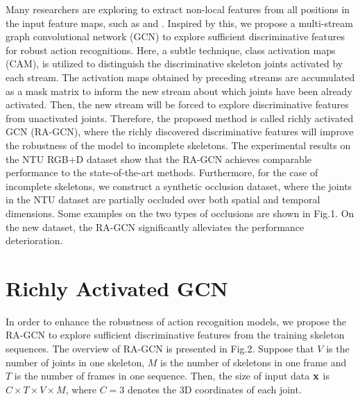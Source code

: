 \documentclass{article}
\begin{document}
Many researchers are exploring to extract non-local features from all positions in the input feature maps, such as \cite{Wang2018} and \cite{Li2018c}. Inspired by this, we propose a multi-stream graph convolutional network (GCN) to explore sufficient discriminative features for robust action recognitions. Here, a subtle technique, class activation maps (CAM), is utilized to distinguish the discriminative skeleton joints activated by each stream. The activation maps obtained by preceding streams are accumulated as a mask matrix to inform the new stream about which joints have been already activated. Then, the new stream will be forced to explore discriminative features from unactivated joints. Therefore, the proposed method is called richly activated GCN (RA-GCN), where the richly discovered discriminative features will improve the robustness of the model to incomplete skeletons. The experimental results on the NTU RGB+D dataset \cite{Shahroudy2016} show that the RA-GCN achieves comparable performance to the state-of-the-art methods. Furthermore, for the case of incomplete skeletons, we construct a synthetic occlusion dataset, where the joints in the NTU dataset are partially occluded over both spatial and temporal dimensions. Some examples on the two types of occlusions are shown in Fig.1. On the new dataset, the RA-GCN significantly alleviates the performance deterioration.


\section{Richly Activated GCN}
\label{sec:RAGCN}

In order to enhance the robustness of action recognition models, we propose the RA-GCN to explore sufficient discriminative features from the training skeleton sequences. The overview of RA-GCN is presented in Fig.2. Suppose that $V$ is the number of joints in one skeleton, $M$ is the number of skeletons in one frame and $T$ is the number of frames in one sequence. Then, the size of input data $\bf x$ is $C\times T\times V\times M$, where $C=3$ denotes the 3D coordinates of each joint. 
\end{document}
